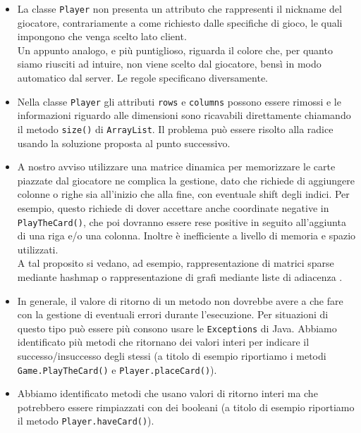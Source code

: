 \documentclass[12pt]{article}
\begin{document}
\begin{itemize}

    \item La classe \texttt{Player} non presenta un attributo che rappresenti il nickname del giocatore, contrariamente a come richiesto dalle specifiche di gioco, le quali impongono che venga scelto lato client.\\
    Un appunto analogo, e più puntiglioso, riguarda il colore che, per quanto siamo riusciti ad intuire, non viene scelto dal giocatore, bensì in modo automatico dal server. Le regole specificano diversamente.

    \item Nella classe \texttt{Player} gli attributi \texttt{rows} e \texttt{columns} possono essere rimossi e le informazioni riguardo alle dimensioni sono ricavabili direttamente chiamando il metodo \texttt{size()} di \texttt{ArrayList}. Il problema può essere risolto alla radice usando la soluzione proposta al punto successivo.

    \item A nostro avviso utilizzare una matrice dinamica per memorizzare le carte piazzate dal giocatore ne complica la gestione, dato che richiede di aggiungere colonne o righe sia all'inizio che alla fine, con eventuale shift degli indici. Per esempio, questo richiede di dover accettare anche coordinate negative in \texttt{PlayTheCard()}, che poi dovranno essere rese positive in seguito all'aggiunta di una riga e/o una colonna. Inoltre è inefficiente a livello di memoria e spazio utilizzati.\\
    A tal proposito si vedano, ad esempio, rappresentazione di matrici sparse mediante hashmap o rappresentazione di grafi mediante liste di adiacenza \cite{cormen_adjlist}.

    \item In generale, il valore di ritorno di un metodo non dovrebbe avere a che fare con la gestione di eventuali errori durante l'esecuzione. Per situazioni di questo tipo può essere più consono usare le \texttt{Exceptions} di Java. Abbiamo identificato più metodi che ritornano dei valori interi per indicare il successo/insuccesso degli stessi (a titolo di esempio riportiamo i metodi \texttt{Game.PlayTheCard()} e \texttt{Player.placeCard()}).

    \item Abbiamo identificato metodi che usano valori di ritorno interi ma che potrebbero essere rimpiazzati con dei booleani (a titolo di esempio riportiamo il metodo \texttt{Player.haveCard()}).


\end{itemize}
\end{document}
